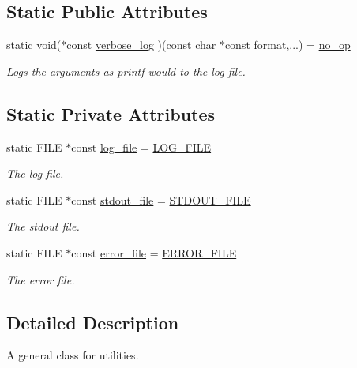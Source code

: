 \subsection*{Static Public Attributes}
\begin{DoxyCompactItemize}
\item 
static void($\ast$const \hyperlink{class_utilities_aea2455488648f9acb6f72dea878b3782}{verbose\+\_\+log} )(const char $\ast$const format,...) = \hyperlink{utilities_8cpp_a1c9ff67441d2537fadf0f0d8a655448e}{no\+\_\+op}
\begin{DoxyCompactList}\small\item\em Logs the arguments as printf would to the log file. \end{DoxyCompactList}\end{DoxyCompactItemize}
\subsection*{Static Private Attributes}
\begin{DoxyCompactItemize}
\item 
static F\+I\+LE $\ast$const \hyperlink{class_utilities_ab6252fb13f3e69ee6108879fc3125bff}{log\+\_\+file} = \hyperlink{constants_8hpp_a69d4676733f5e850f451942b6d901382}{L\+O\+G\+\_\+\+F\+I\+LE}
\begin{DoxyCompactList}\small\item\em The log file. \end{DoxyCompactList}\item 
static F\+I\+LE $\ast$const \hyperlink{class_utilities_a224eea0a234ac9877a8334f74fc89ef0}{stdout\+\_\+file} = \hyperlink{constants_8hpp_a195ca3987a60992c5abfc663cd37151d}{S\+T\+D\+O\+U\+T\+\_\+\+F\+I\+LE}
\begin{DoxyCompactList}\small\item\em The stdout file. \end{DoxyCompactList}\item 
static F\+I\+LE $\ast$const \hyperlink{class_utilities_afc3b1cf892b76cede8fa87bfdd17533c}{error\+\_\+file} = \hyperlink{constants_8hpp_a9fdff3d78b754d4b831816d0560dbb57}{E\+R\+R\+O\+R\+\_\+\+F\+I\+LE}
\begin{DoxyCompactList}\small\item\em The error file. \end{DoxyCompactList}\end{DoxyCompactItemize}


\subsection{Detailed Description}
A general class for utilities. 


